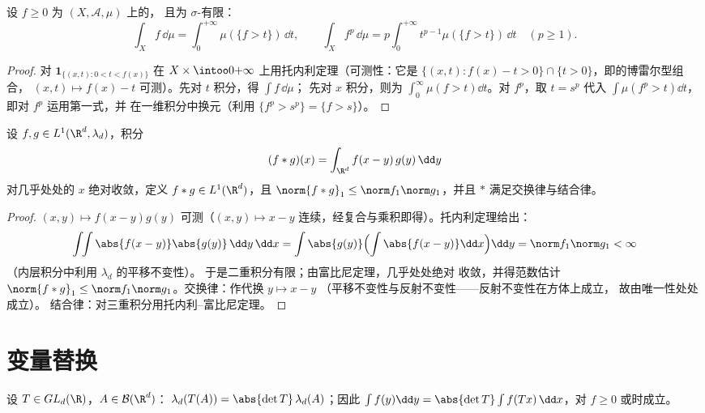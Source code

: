 \begin{proposition}[层蛋糕公式]\label{prop:b3:product:layercake}
设 $f \geq 0$ 为 $(X, \mathcal A, \mu)$ 上的，
且为 $\sigma$-有限：
\[
\int_X f\,\dd\mu = \int_0^{+\infty}\mu(\{f > t\})\,\dd t,
\qquad
\int_X f^p\,\dd\mu = p\int_0^{+\infty}t^{p-1}\mu(\{f >
t\})\,\dd t \quad (p \geq 1).
\]
\end{proposition}

\begin{proof}
对 $\mathbf 1_{\{(x,t) : 0 < t < f(x)\}}$ 在 $X
\times \intoo0{+\infty}$ 上用托内利定理（可测性：它是 $\{(x,t): f(x) - t
> 0\}\cap\{t > 0\}$，即的博雷尔型组合，
$(x,t)\mapsto f(x) - t$ 可测）。先对 $t$ 积分，得 $\int f\,\dd\mu$；
先对 $x$ 积分，则为 $\int_0^\infty\mu(f >
t)\dd t$。对 $f^p$，取 $t = s^p$ 代入 $\int\mu(f^p > t)
\dd t$，即对 $f^p$ 运用第一式，并
在一维积分中换元（利用 $\{f^p > s^p\} =
\{f > s\}$）。
\end{proof}

\begin{theorem}[$L^1$ 上的卷积]\label{thm:b3:product:convolution}
设 $f, g \in L^1(\R^d, \lambda_d)$，积分
\[
(f * g)(x) = \int_{\R^d} f(x - y)\,g(y)\,\dd y
\]
对几乎处处的 $x$ 绝对收敛，定义 $f * g \in
L^1(\R^d)$，且 $\norm{f*g}_1 \leq \norm f_1\norm g_1$，并且
$*$ 满足交换律与结合律。
\end{theorem}

\begin{proof}
$(x, y) \mapsto f(x-y)g(y)$ 可测（$(x,y)\mapsto x -
y$ 连续，经复合与乘积即得）。托内利定理给出：
\[
\int\!\!\int \abs{f(x-y)}\abs{g(y)}\,\dd y\,\dd x
= \int\abs{g(y)}\Bigl(\int\abs{f(x - y)}\dd x\Bigr)\dd y
= \norm f_1\norm g_1 < \infty
\]
（内层积分中利用 $\lambda_d$ 的平移不变性）。
于是二重积分有限；由富比尼定理，几乎处处绝对
收敛，并得范数估计 $\norm{f*g}_1 \leq \norm
f_1\norm g_1$。交换律：作代换 $y \mapsto x - y$
（平移不变性与反射不变性——反射不变性在方体上成立，
故由唯一性处处成立）。
结合律：对三重积分用托内利--富比尼定理。
\end{proof}

\section{变量替换}

\begin{theorem}[线性变量替换]
\label{thm:b3:product:linearchange}
设 $T \in GL_d(\R)$，$A \in \mathcal B(\R^d)$：
$\lambda_d(T(A)) = \abs{\det T}\,\lambda_d(A)$；因此
$\int f(y)\dd y = \abs{\det T}\int f(Tx)\,\dd x$，对 $f \geq 0$
或时成立。
\end{theorem}

